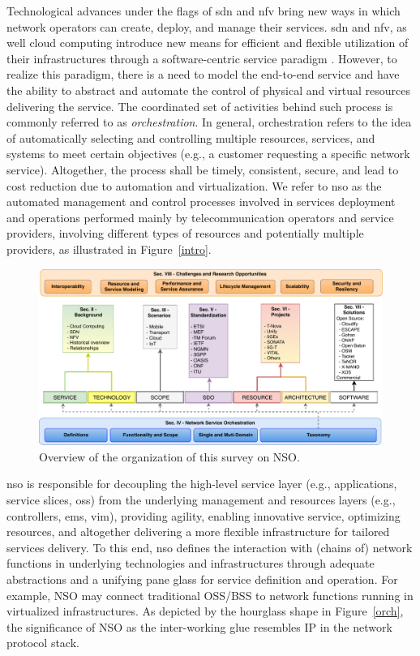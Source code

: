 Technological advances under the flags of \gls{sdn} \cite{surveySDN} and \gls{nfv} \cite{Mijumbi2016NetworkChallenges} bring new ways in which network operators can create, deploy, and manage their services. \gls{sdn} and \gls{nfv}, as well cloud computing introduce new means for efficient and flexible utilization of their infrastructures through a software-centric service paradigm \cite{Sonkoly2014UNIFYingView}. However, to realize this paradigm, there is a need to model the end-to-end service and have the ability to abstract and automate the control of physical and virtual resources delivering the service. The coordinated set of activities behind such process is commonly referred to as \textit{orchestration}. In general, orchestration refers to the idea of automatically selecting and controlling multiple resources, services, and systems to meet certain objectives (e.g., a customer requesting a specific network service). Altogether, the process shall be timely, consistent, secure, and lead to cost reduction due to automation and virtualization. We refer to \gls{nso} as the automated management and control processes involved in services deployment and operations  performed mainly by telecommunication operators and service providers, involving different types of resources and potentially multiple providers, as illustrated in Figure~\ref{intro}.



\begin{figure}[t!]
  \centering
  \includegraphics[scale=.6]{Figures/01_Introduction/org}
    \caption{Overview of the organization of this survey on NSO.}
    \label{org}
\end{figure}

\gls{nso} is responsible for decoupling the high-level service layer (e.g., applications, service  slices, \gls{oss}) from the underlying management and resources layers (e.g., controllers, \gls{ems}, \gls{vim}), providing agility, enabling innovative service, optimizing resources, and altogether delivering a more flexible infrastructure for tailored services delivery. To this end, \gls{nso}  defines the interaction with (chains of) network functions in underlying technologies and infrastructures through adequate abstractions and a unifying pane glass for service definition and operation. For example, NSO may connect traditional OSS/BSS to network functions running in virtualized infrastructures. As depicted by the hourglass shape in Figure~\ref{orch}, the  significance of NSO as the inter-working glue resembles IP in the network protocol stack.   


